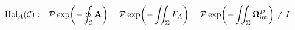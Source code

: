 \documentclass[preview]{standalone}
\begin{document}
\begin{align*}
\special{dvisvgm:raw <g id='unique000'>}\operatorname{Hol}_A(\mathcal{C}) := \mathcal{P}\exp\!\left(-\oint_{\mathcal{C}} \mathbf{A}\right) = \mathcal{P}\exp\!\left(-\iint_\Sigma F_A\right) = \mathcal{P}\exp\!\left(-\iint_\Sigma \mathbf{\Omega}_{\text{int}}^{\mathcal{D}}\right) \neq I\special{dvisvgm:raw </g>}
\end{align*}
\end{document}
